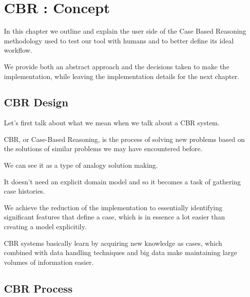 %
%

\chapter{CBR : Concept}

\begin{resumen}
In this chapter we outline and explain the user side of the Case Based Reasoning methodology used to test our tool with humans and to better define its ideal workflow.

We provide both an abstract approach and the decisions taken to make the implementation, while leaving the implementation details for the next chapter.
\end{resumen}


\section{CBR Design}
\label{cap1:sec:introduccion}

Let's first talk about what we mean when we talk about a CBR system.

CBR, or Case-Based Reasoning, is the process of solving new problems based on the solutions of similar problems we may have encountered before.

We can see it as a type of analogy solution making.

It doesn't need an explicit domain model and so it becomes a task of gathering case histories. 

We achieve the reduction of the implementation to essentially identifying significant features that define a case, which is in essence a lot easier than creating a model explicitily. 

CBR systems basically learn by acquiring new knowledge as cases, which combined with data handling techniques and big data make maintaining large volumes of information easier.

\section{CBR Process}
\label{cap1:sec:process}


